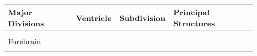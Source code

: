 \begin{table}[htbp]
      \centering
      \begin{tabular}{l l l l}
            \toprule
            \textbf{Major Divisions} & \textbf{Ventricle}                                       & \textbf{Subdivision}          & \textbf{Principal Structures} \\
            \midrule

            \multirow{7}{*}{Forebrain}
                                     & \multirow{5}{*}{\underline{\hspace{3cm}}}
                                     & \multirow{4}{*}{\underline{\hspace{3cm}}}
                                     & \underline{\hspace{3cm}}                                                                                   \\
                                     &                                                          &
                                     & \underline{\hspace{3cm}}                                                                                   \\
                                     &                                                          &
                                     & \underline{\hspace{3cm}}                                                                                     \\
                                     &                                                          &
                                     & \underline{\hspace{3cm}}                                                                                     \\[0.5em]
            \cline{3-4}                                                                                                                                         \\[-0.5em]
                                     & \multirow{2}{*}{\underline{\hspace{3cm}}}             & \multirow{2}{*}{\underline{\hspace{3cm}}}
                                     & \underline{\hspace{3cm}}                                                                                          \\
                                     &                                                          &
                                     & \underline{\hspace{3cm}}                                                                                      \\
            \midrule


\end{tabular}
\end{table}
